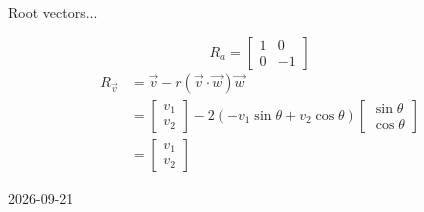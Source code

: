 \documentclass[11pt]{article}
\numberwithin{equation}{section}
\begin{document}
\begin{noot}
  Root vectors...

  \begin{equation*}
    R _{a} =
    \begin{bmatrix}
      1 & 0\\
      0 & -1
    \end{bmatrix}
  \end{equation*}
  \begin{equation*}
    \begin{split}
      R _{\vec{v}} &= \vec{v} - r \left( \vec{v} \cdot \vec{w} \right) \vec{w}\\
                   &= \begin{bmatrix} v _{1}\\ v _{2} \end{bmatrix} - 2 \left( - v _{1} \sin \theta + v _{2} \cos \theta \right) \begin{bmatrix} \sin \theta\\ \cos \theta \end{bmatrix}\\
                   &= \begin{bmatrix} v _{1}\\ v _{2} \end{bmatrix}
    \end{split}
  \end{equation*}
\end{noot}

2026-09-21
\end{document}
